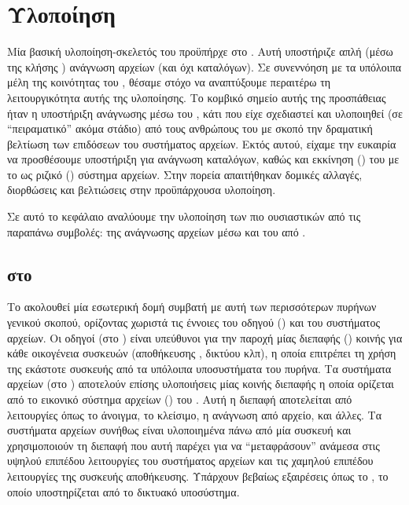 \chapter{Υλοποίηση}

Μία βασική υλοποίηση-σκελετός του \viofs{} προϋπήρχε στο \osv{}. %
Αυτή υποστήριζε
απλή (μέσω της κλήσης ) ανάγνωση αρχείων (και όχι καταλόγων).
Σε συνεννόηση με τα υπόλοιπα μέλη της κοινότητας του \osv{}, θέσαμε στόχο να
αναπτύξουμε περαιτέρω τη λειτουργικότητα αυτής της υλοποίησης. Το κομβικό
σημείο αυτής της προσπάθειας ήταν η υποστήριξη ανάγνωσης μέσω του \viofs{}
, κάτι που είχε σχεδιαστεί και υλοποιηθεί (σε ``πειραματικό''
ακόμα στάδιο) από τους ανθρώπους του \viofs{} με σκοπό την δραματική βελτίωση
των επιδόσεων του συστήματος αρχείων. Εκτός αυτού, είχαμε την ευκαιρία να
προσθέσουμε υποστήριξη για ανάγνωση καταλόγων, καθώς και εκκίνηση ()
του \osv{} με το \viofs{} ως ριζικό () σύστημα αρχείων. Στην πορεία
απαιτήθηκαν δομικές αλλαγές, διορθώσεις και βελτιώσεις στην προϋπάρχουσα
υλοποίηση.

Σε αυτό το κεφάλαιο αναλύουμε την υλοποίηση των πιο ουσιαστικών από τις παραπάνω
συμβολές: της ανάγνωσης αρχείων μέσω  και του  από
\viofs{}.

\section{ στο \viofs{}}

Το \osv{} ακολουθεί μία εσωτερική δομή συμβατή με αυτή των περισσότερων πυρήνων
γενικού σκοπού, ορίζοντας χωριστά τις έννοιες του οδηγού () και του
συστήματος αρχείων. Οι οδηγοί (στο ) είναι υπεύθυνοι για
την παροχή μίας διεπαφής () κοινής για κάθε οικογένεια συσκευών
(αποθήκευσης , δικτύου κλπ), η οποία επιτρέπει τη χρήση της εκάστοτε
συσκευής από τα υπόλοιπα υποσυστήματα του πυρήνα. Τα συστήματα αρχείων (στο
) αποτελούν επίσης υλοποιήσεις μίας κοινής διεπαφής η οποία ορίζεται από
το εικονικό σύστημα αρχείων () του \osv{}. Αυτή η
διεπαφή αποτελείται από λειτουργίες όπως το άνοιγμα, το κλείσιμο, η ανάγνωση από
αρχείο, και άλλες. Τα συστήματα αρχείων συνήθως είναι υλοποιημένα πάνω από μία
συσκευή  και χρησιμοποιούν τη διεπαφή που αυτή παρέχει για να
``μεταφράσουν'' ανάμεσα στις υψηλού επιπέδου λειτουργίες του συστήματος αρχείων
και τις χαμηλού επιπέδου λειτουργίες της συσκευής αποθήκευσης. Υπάρχουν βεβαίως
εξαιρέσεις όπως το , το οποίο υποστηρίζεται από το δικτυακό υποσύστημα.

